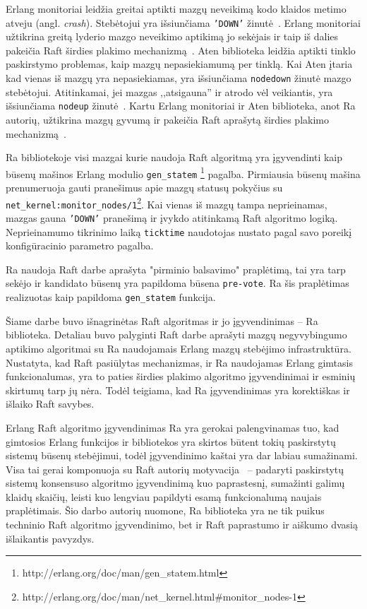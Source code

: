 \documentclass{VUMIFPSkursinis}
\begin{document}
Erlang monitoriai leidžia greitai aptikti mazgų neveikimą kodo klaidos metimo atveju (angl. \textit{crash}). Stebėtojui yra išsiunčiama \texttt{'DOWN'} žinutė~\cite{ericsson_erlang_processes_2016}. Erlang monitoriai užtikrina greitą lyderio mazgo neveikimo aptikimą jo sekėjais ir taip iš dalies pakeičia Raft širdies plakimo mechanizmą~\cite{rabbitmqra}. Aten biblioteka leidžia aptikti tinklo paskirstymo problemas, kaip mazgų nepasiekiamumą per tinklą. Kai Aten įtaria kad vienas iš mazgų yra nepasiekiamas, yra išsiunčiama \texttt{nodedown} žinutė mazgo stebėtojui. Atitinkamai, jei mazgas ,,atsigauna'' ir atrodo vėl veikiantis, yra išsiunčiama \texttt{nodeup} žinutė~\cite{rabbitmq_aten_2020}. Kartu Erlang monitoriai ir Aten biblioteka, anot Ra autorių, užtikrina mazgų gyvumą ir pakeičia Raft aprašytą širdies plakimo mechanizmą~\cite{rabbitmqra}. 

Ra bibliotekoje visi mazgai kurie naudoja Raft algoritmą yra įgyvendinti kaip būsenų mašinos Erlang modulio \texttt{gen\_statem} \footnote{http://erlang.org/doc/man/gen\_statem.html} pagalba. 
Pirmiausia būsenų mašina  prenumeruoja gauti pranešimus apie mazgų statusų pokyčius su \texttt{net\_kernel:monitor\_nodes/1}\footnote{http://erlang.org/doc/man/net\_kernel.html\#monitor\_nodes-1}. Kai vienas iš mazgų tampa neprieinamas, mazgas gauna \texttt{'DOWN'} pranešimą ir įvykdo atitinkamą Raft algoritmo logiką. Neprieinamumo tikrinimo laiką \texttt{ticktime} naudotojas nustato pagal savo poreikį konfigūracinio parametro pagalba.

Ra  naudoja Raft darbe aprašyta "pirminio balsavimo" praplėtimą, tai yra tarp sekėjo ir kandidato būsenų yra papildoma būsena \texttt{pre-vote}. Ra šis praplėtimas realizuotas kaip papildoma \texttt{gen\_statem} funkcija.



Šiame darbe buvo išnagrinėtas Raft algoritmas ir jo įgyvendinimas -- Ra biblioteka. Detaliau buvo palyginti Raft darbe aprašyti mazgų negyvybingumo aptikimo algoritmai su Ra naudojamais Erlang mazgų stebėjimo infrastruktūra. Nustatyta, kad Raft pasiūlytas mechanizmas, ir Ra naudojamas Erlang gimtasis funkcionalumas, yra to paties širdies plakimo algoritmo įgyvendinimai ir esminių skirtumų tarp jų nėra. Todėl teigiama, kad Ra įgyvendinimas yra korektiškas ir išlaiko Raft savybes.

Erlang Raft algoritmo įgyvendinimas Ra yra gerokai palengvinamas tuo, kad gimtosios Erlang funkcijos ir bibliotekos yra skirtos būtent tokių paskirstytų sistemų būsenų stebėjimui, todėl įgyvendinimo kaštai yra dar labiau sumažinami. Visa tai gerai komponuoja su Raft autorių motyvacija~\cite{ongaro_consensus} -- padaryti paskirstytų sistemų konsensuso algoritmo įgyvendinimą kuo paprastesnį, sumažinti galimų klaidų skaičių, leisti kuo lengviau papildyti esamą funkcionalumą naujais praplėtimais. Šio darbo autorių nuomone, Ra biblioteka yra ne tik puikus techninio Raft algoritmo įgyvendinimo, bet ir Raft paprastumo ir aiškumo dvasią išlaikantis pavyzdys. 
\end{document}

